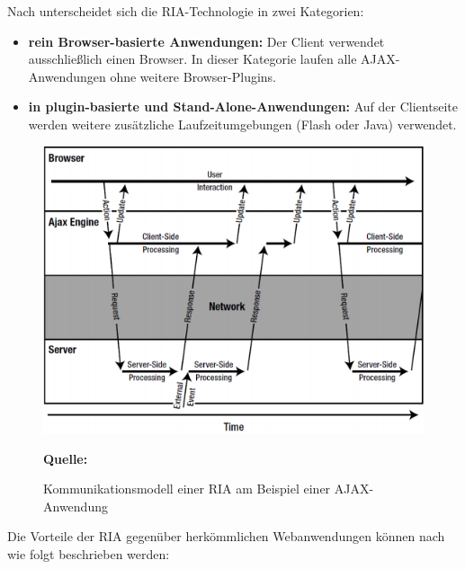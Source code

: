 Nach \cite{Lei2007a} unterscheidet sich die RIA-Technologie in zwei Kategorien:

\begin{itemize}
\item \textbf{rein Browser-basierte Anwendungen:}
Der Client verwendet ausschließlich einen Browser. In dieser Kategorie laufen alle AJAX-Anwendungen ohne weitere Browser-Plugins.
\item \textbf{in plugin-basierte und Stand-Alone-Anwendungen:}
Auf der Clientseite werden weitere zusätzliche Laufzeitumgebungen (Flash oder Java) verwendet.
\end{itemize}

\begin{figure}[H]
  \begin{center}
    \includegraphics[scale=0.6]{img/RIA}
	\caption{Kommunikationsmodell einer RIA am Beispiel einer AJAX-Anwendung}
	\footnotesize\sffamily\textbf{Quelle:} \cite{Ban2008b}  
	\label{fig:richInternetApplications}
  \end{center}   
\end{figure}

Die Vorteile der RIA gegenüber herkömmlichen Webanwendungen können nach \cite{Leif2007b} wie folgt beschrieben werden:


